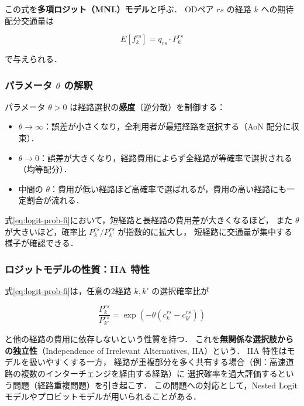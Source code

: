 この式を\textbf{多項ロジット（MNL）モデル}と呼ぶ．
ODペア $rs$ の経路 $k$ への期待配分交通量は

\begin{equation}
  E[f_k^{rs}] = q_{rs} \cdot P_k^{rs}
  \label{eq:logit-flow}
\end{equation}

で与えられる．

\subsubsection*{パラメータ $\theta$ の解釈}

パラメータ $\theta > 0$ は経路選択の\textbf{感度}（逆分散）を制御する：

\begin{itemize}
  \item $\theta \to \infty$：誤差が小さくなり，全利用者が最短経路を選択する（AoN 配分に収束）．
  \item $\theta \to 0$：誤差が大きくなり，経路費用によらず全経路が等確率で選択される（均等配分）．
  \item 中間の $\theta$：費用が低い経路ほど高確率で選ばれるが，費用の高い経路にも一定割合が流れる．
\end{itemize}

式\eqref{eq:logit-prob-fi}において，短経路と長経路の費用差が大きくなるほど，
また $\theta$ が大きいほど，確率比 $P_k^{rs}/P_{k'}^{rs}$ が指数的に拡大し，
短経路に交通量が集中する様子が確認できる．

\subsubsection*{ロジットモデルの性質：IIA 特性}

式\eqref{eq:logit-prob-fi}は，任意の2経路 $k, k'$ の選択確率比が

\begin{equation}
  \frac{P_k^{rs}}{P_{k'}^{rs}} = \exp\!\left(-\theta(c_k^{rs} - c_{k'}^{rs})\right)
  \label{eq:iia}
\end{equation}

と他の経路の費用に依存しないという性質を持つ．
これを\textbf{無関係な選択肢からの独立性}（Independence of Irrelevant Alternatives, IIA）という\cite{McFadden1974}．
IIA 特性はモデルを扱いやすくする一方，
経路が重複部分を多く共有する場合（例：高速道路の複数のインターチェンジを経由する経路）に
選択確率を過大評価するという問題（経路重複問題）を引き起こす．
この問題への対応として，Nested Logit モデルやプロビットモデルが用いられることがある\cite{Daganzo1977}．

